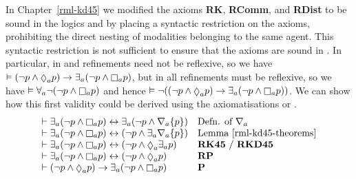 In Chapter~\ref{rml-kd45} we modified the axioms {\bf RK}, {\bf RComm}, and {\bf RDist} to be sound in the logics \logicRmlKFF{} and \logicRmlKD{} by placing a syntactic restriction on the axioms, prohibiting the direct nesting of modalities belonging to the same agent.
This syntactic restriction is not sufficient to ensure that the axioms are sound in \logicRmlS{}.
In particular, in \logicRmlKFF{} and \logicRmlKD{} refinements need not be reflexive, so we have $\entails (\lnot \atomP \land \possibleA \atomP) \implies \somerefsA (\lnot \atomP \land \necessaryA \atomP)$, but in \logicRmlS{} all refinements must be reflexive, so we have $\entails \allrefsA \lnot (\lnot \atomP \land \necessaryA \atomP)$ and hence $\entails \lnot ((\lnot \atomP \land \possibleA \atomP) \implies \somerefsA (\lnot \atomP \land \necessaryA \atomP))$.
We can show how this first validity could be derived using the axiomatisations \axiomRmlKFF{} or \axiomRmlKD{}.
$$
\begin{array}{ll}
    \proves \somerefsA (\lnot \atomP \land \necessaryA \atomP) \iff \somerefsA (\lnot \atomP \land \coversA \{\atomP\}) & \text{Defn. of $\coversA$}\\
    \proves \somerefsA (\lnot \atomP \land \necessaryA \atomP) \iff (\lnot \atomP \land \somerefsA \coversA \{\atomP\}) & \text{Lemma~\ref{rml-kd45-theorems}}\\
    \proves \somerefsA (\lnot \atomP \land \necessaryA \atomP) \iff (\lnot \atomP \land \possibleA \somerefsA \atomP) & \text{{\bf RK45} / {\bf RKD45}}\\
    \proves \somerefsA (\lnot \atomP \land \necessaryA \atomP) \iff (\lnot \atomP \land \possibleA \atomP) & {\bf RP}\\
    \proves (\lnot \atomP \land \possibleA \atomP) \implies \somerefsA (\lnot \atomP \land \necessaryA \atomP) & {\bf P}
\end{array}
$$

